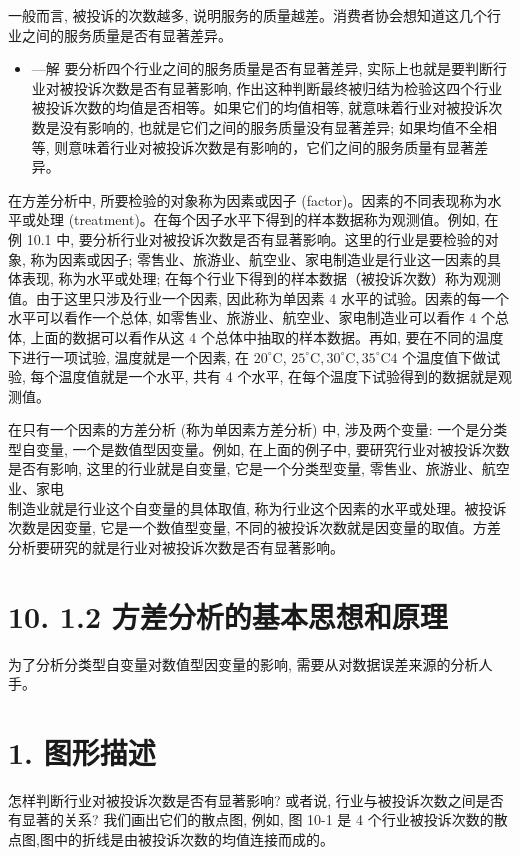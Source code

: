 \documentclass[10pt]{article}
\begin{document}
\begin{CJK*}{UTF8}{bsmi}
一般而言, 被投诉的次数越多, 说明服务的质量越差。消费者协会想知道这几个行业之间的服务质量是否有显著差异。

\begin{itemize}
  \item —解 要分析四个行业之间的服务质量是否有显著差异, 实际上也就是要判断行业对被投诉次数是否有显著影响, 作出这种判断最终被归结为检验这四个行业被投诉次数的均值是否相等。如果它们的均值相等, 就意味着行业对被投诉次数是没有影响的, 也就是它们之间的服务质量没有显著差异; 如果均值不全相等, 则意味着行业对被投诉次数是有影响的，它们之间的服务质量有显著差异。
\end{itemize}

在方差分析中, 所要检验的对象称为因素或因子 (factor)。因素的不同表现称为水平或处理 (treatment)。在每个因子水平下得到的样本数据称为观测值。例如, 在例 10.1 中, 要分析行业对被投诉次数是否有显著影响。这里的行业是要检验的对象, 称为因素或因子; 零售业、旅游业、航空业、家电制造业是行业这一因素的具体表现, 称为水平或处理; 在每个行业下得到的样本数据（被投诉次数）称为观测值。由于这里只涉及行业一个因素, 因此称为单因素 4 水平的试验。因素的每一个水平可以看作一个总体, 如零售业、旅游业、航空业、家电制造业可以看作 4 个总体, 上面的数据可以看作从这 4 个总体中抽取的样本数据。再如, 要在不同的温度下进行一项试验, 温度就是一个因素, 在 $20^{\circ} \mathrm{C}$, $25^{\circ} \mathrm{C}, 30^{\circ} \mathrm{C}, 35^{\circ} \mathrm{C} 4$ 个温度值下做试验, 每个温度值就是一个水平, 共有 4 个水平, 在每个温度下试验得到的数据就是观测值。

在只有一个因素的方差分析 (称为单因素方差分析) 中, 涉及两个变量: 一个是分类型自变量, 一个是数值型因变量。例如, 在上面的例子中, 要研究行业对被投诉次数是否有影响, 这里的行业就是自变量, 它是一个分类型变量, 零售业、旅游业、航空业、家电\\
制造业就是行业这个自变量的具体取值, 称为行业这个因素的水平或处理。被投诉次数是因变量, 它是一个数值型变量, 不同的被投诉次数就是因变量的取值。方差分析要研究的就是行业对被投诉次数是否有显著影响。

\section*{10. 1.2 方差分析的基本思想和原理}
为了分析分类型自变量对数值型因变量的影响, 需要从对数据误差来源的分析人手。

\section*{1. 图形描述}
怎样判断行业对被投诉次数是否有显著影响? 或者说, 行业与被投诉次数之间是否有显著的关系? 我们画出它们的散点图, 例如, 图 10-1 是 4 个行业被投诉次数的散点图,图中的折线是由被投诉次数的均值连接而成的。


\end{CJK*}
\end{document}
